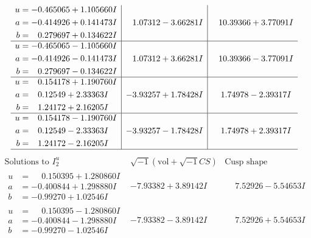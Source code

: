 \documentclass[1p]{elsarticle_modified}
\theoremstyle{definition}
\newcommand{\I}{\sqrt{-1}}
\begin{document}
$$\begin{array}{c|c|c}
\begin{aligned}
u &= -0.465065 + 1.105660 I \\
a &= -0.414926 + 0.141473 I \\
b &= \phantom{-}0.279697 + 0.134622 I\end{aligned}
 & \phantom{-}1.07312 - 3.66281 I & \phantom{-}10.39366 + 3.77091 I \\ \hline\begin{aligned}
u &= -0.465065 - 1.105660 I \\
a &= -0.414926 - 0.141473 I \\
b &= \phantom{-}0.279697 - 0.134622 I\end{aligned}
 & \phantom{-}1.07312 + 3.66281 I & \phantom{-}10.39366 - 3.77091 I \\ \hline\begin{aligned}
u &= \phantom{-}0.154178 + 1.190760 I \\
a &= \phantom{-}0.12549 + 2.33363 I \\
b &= \phantom{-}1.24172 + 2.16205 I\end{aligned}
 & -3.93257 + 1.78428 I & \phantom{-}1.74978 - 2.39317 I \\ \hline\begin{aligned}
u &= \phantom{-}0.154178 - 1.190760 I \\
a &= \phantom{-}0.12549 - 2.33363 I \\
b &= \phantom{-}1.24172 - 2.16205 I\end{aligned}
 & -3.93257 - 1.78428 I & \phantom{-}1.74978 + 2.39317 I\\
 \hline 
 \end{array}$$\newpage$$\begin{array}{c|c|c}  
\text{Solutions to }I^u_{2}& \I (\text{vol} + \sqrt{-1}CS) & \text{Cusp shape}\\
 \hline 
\begin{aligned}
u &= \phantom{-}0.150395 + 1.280860 I \\
a &= -0.400844 + 1.298880 I \\
b &= -0.99270 + 1.02546 I\end{aligned}
 & -7.93382 + 3.89142 I & \phantom{-}7.52926 - 5.54653 I \\ \hline\begin{aligned}
u &= \phantom{-}0.150395 - 1.280860 I \\
a &= -0.400844 - 1.298880 I \\
b &= -0.99270 - 1.02546 I\end{aligned}
 & -7.93382 - 3.89142 I & \phantom{-}7.52926 + 5.54653 I \\ \hline\begin{aligned}

\end{aligned}
\end{array}$$
\end{document}
